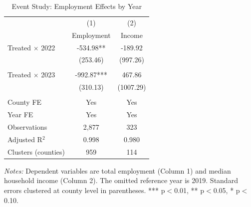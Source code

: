 \documentclass[12pt]{article}
\begin{document}
\begin{table}[H]
\centering
\caption{Event Study: Employment Effects by Year}
\label{tab:event_study}
\begin{tabular}{lcc}
\toprule
& (1) & (2) \\
& Employment & Income \\
\midrule
Treated $\times$ 2022 & -534.98** & -189.92 \\
& (253.46) & (997.26) \\
\\
Treated $\times$ 2023 & -992.87*** & 467.86 \\
& (310.13) & (1007.29) \\
\\
County FE & Yes & Yes \\
Year FE & Yes & Yes \\
\midrule
Observations & 2,877 & 323 \\
Adjusted R$^2$ & 0.998 & 0.980 \\
Clusters (counties) & 959 & 114 \\
\bottomrule
\end{tabular}
\begin{tablenotes}
\small
\item \textit{Notes:} Dependent variables are total employment (Column 1) and median household income (Column 2). The omitted reference year is 2019. Standard errors clustered at county level in parentheses. *** p$<$0.01, ** p$<$0.05, * p$<$0.10.
\end{tablenotes}
\end{table}
\end{document}
